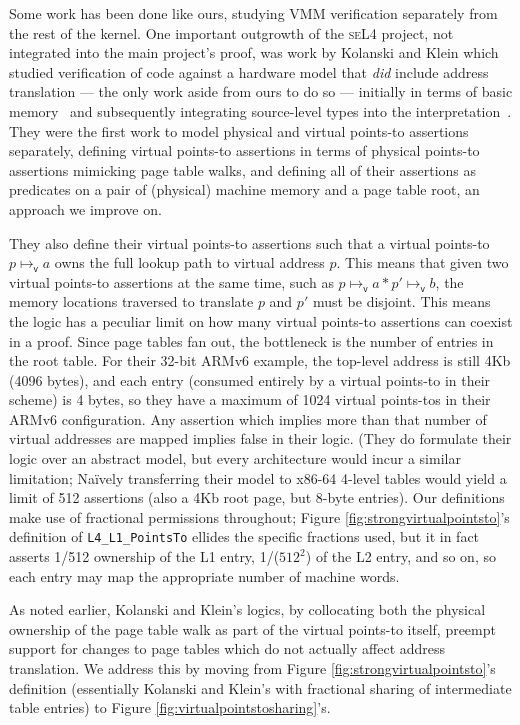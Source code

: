 Some work has been done like ours, studying VMM verification separately from the rest of the kernel.
One important outgrowth of the \textsc{seL4} project, not integrated into the main project's proof, was work by 
Kolanski and Klein which studied verification of code against a hardware model that \emph{did} include address translation
 --- the only work aside from ours to do so --- initially in terms of basic memory~\cite{kolanski08vstte} and subsequently 
integrating source-level types into the interpretation~\cite{kolanski09tphols}. 
They were the first work to model physical and virtual points-to assertions separately, defining virtual points-to assertions
in terms of physical points-to assertions mimicking page table walks, and defining all of their assertions as predicates on a
pair of (physical) machine memory and a page table root, an approach we improve on.

They also define their virtual points-to assertions such that a virtual points-to $p\mapsto_\mathsf{v} a$ owns the full 
lookup path to virtual address $p$. This means that given two virtual points-to assertions at the same time, such as 
$p\mapsto_\mathsf{v}a \ast p'\mapsto_\mathsf{v}b$, the memory locations traversed to translate $p$ and $p'$ must be disjoint. 
This means the logic has a peculiar limit on how many virtual points-to assertions can coexist in a proof. Since page tables 
fan out, the bottleneck is the number of entries in the root table. For their 32-bit ARMv6 example, the top-level address is 
still 4Kb (4096 bytes), and each entry (consumed entirely by a virtual points-to in their scheme) is 4 bytes, so they have a 
maximum of 1024 virtual points-tos in their ARMv6 configuration. Any assertion which implies more than that number
of virtual addresses are mapped implies false in their logic.
(They do formulate their logic over an abstract model, but every architecture would incur a similar limitation;
Na\"ively transferring their model to x86-64 4-level tables would yield a limit of 512 assertions (also a 4Kb root page, 
but 8-byte entries).
Our definitions make use of fractional permissions throughout; Figure \ref{fig:strongvirtualpointsto}'s definition
of \lstinline|L4_L1_PointsTo| ellides the specific fractions used, but it in fact asserts 1/512 ownership of
the L1 entry, 1/($512^2$) of the L2 entry, and so on, so each entry may map the appropriate number of machine words.

As noted earlier, Kolanski and Klein's logics, by collocating both the physical ownership of the page table walk
as part of the virtual points-to itself, preempt support for changes to page tables which do not actually affect 
address translation. We address this by moving from Figure \ref{fig:strongvirtualpointsto}'s definition (essentially Kolanski and Klein's
with fractional sharing of intermediate table entries) to Figure \ref{fig:virtualpointstosharing}'s.

